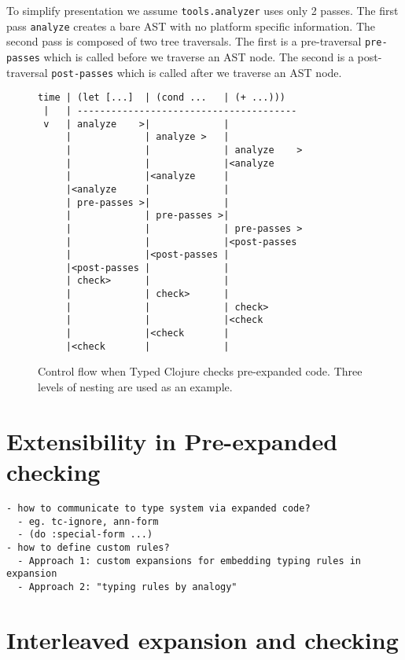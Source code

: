 To simplify presentation we assume \texttt{tools.analyzer}
uses only 2 passes. The first pass \texttt{analyze} creates
a bare AST with no platform specific information.
The second pass is composed of two tree traversals.
The first is a pre-traversal \texttt{pre-passes} which
is called before we traverse an AST node.
The second is a post-traversal \texttt{post-passes} which
is called after we traverse an AST node.

\begin{figure}
\singlespacing
\begin{verbatim}
time | (let [...]  | (cond ...   | (+ ...)))
 |   | ---------------------------------------
 v   | analyze    >|             |
     |             | analyze >   |
     |             |             | analyze    >
     |             |             |<analyze
     |             |<analyze     |
     |<analyze     |             |
     | pre-passes >|             |
     |             | pre-passes >|
     |             |             | pre-passes >
     |             |             |<post-passes
     |             |<post-passes |
     |<post-passes |             |
     | check>      |             |
     |             | check>      |
     |             |             | check>
     |             |             |<check
     |             |<check       |
     |<check       |             |
\end{verbatim}
  \caption{Control flow when Typed Clojure checks pre-expanded code.
  Three levels of nesting are used as an example.
  }
  \label{fig:analyzer:control-flow-pre-expand}
\end{figure}

\chapter{Extensibility in Pre-expanded checking}

{
\singlespacing
\begin{verbatim}
- how to communicate to type system via expanded code?
  - eg. tc-ignore, ann-form
  - (do :special-form ...)
- how to define custom rules?
  - Approach 1: custom expansions for embedding typing rules in expansion
  - Approach 2: "typing rules by analogy"
\end{verbatim}
}

\chapter{Interleaved expansion and checking}

